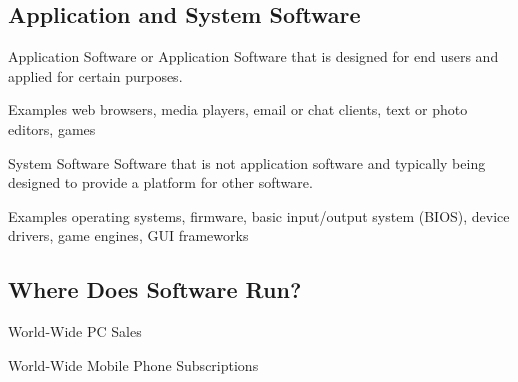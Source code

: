 \subsection{Application and System Software}
\begin{frame}{\insertsubsection}
	\begin{fancycolumns}[T]
		\begin{definition}{Application Software or Application}
			Software that is designed for end users and applied for certain purposes. 
		\end{definition}

		\begin{example}{Examples}
			web browsers, media players, email or chat clients, text or photo editors, games
		\end{example}
	\nextcolumn
		\begin{definition}{System Software}
			Software that is not application software and typically being designed to provide a platform for other software.
		\end{definition}

		\begin{example}{Examples}
			operating systems, firmware, basic input/output system (BIOS), device drivers, game engines, GUI frameworks
		\end{example}
	\end{fancycolumns}

\end{frame}

\subsection{Where Does Software Run?}
\begin{frame}{\insertsubsection}
	\begin{fancycolumns}[widths={43}]
		\begin{example}{World-Wide PC Sales}
		\end{example}
		\nextcolumn
		\begin{example}{World-Wide Mobile Phone Subscriptions}
		\end{example}
	\end{fancycolumns}	
\end{frame}

